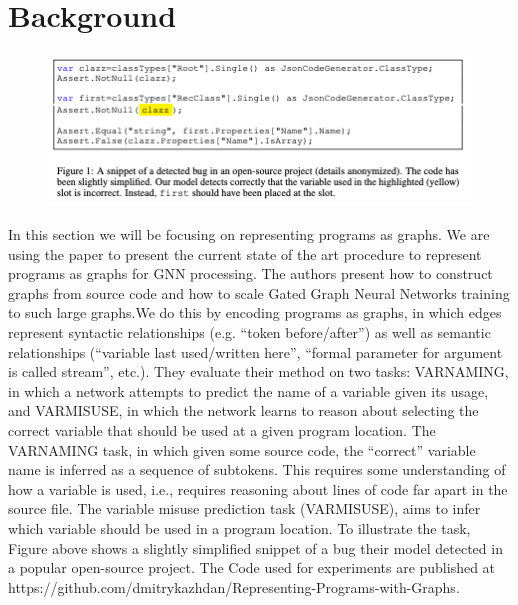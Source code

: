 \documentclass{article}
\begin{document}
\section{Background}

\begin{figure}[ht]
\vskip 0.2in
\begin{center}
\centerline{\includegraphics[width=\columnwidth]{Images/Background1.png}}
\label{icml-historical}
\end{center}
\vskip -0.2in
\end{figure}
In this section we will be focusing on representing programs as graphs. We are using the paper \cite{allamanis2017learning} to present the current state of the art procedure to represent programs as graphs for GNN processing. The authors present how to construct graphs from source code and how to scale Gated Graph Neural Networks training to such large graphs.We do this by encoding programs as graphs, in which edges represent syntactic relationships (e.g. “token before/after”) as well as semantic relationships (“variable last used/written here”, “formal parameter for argument is called stream”, etc.). They evaluate their method on two tasks: VARNAMING, in which a network attempts to predict the name of a variable given its usage, and VARMISUSE, in which the network learns to reason about selecting the correct variable that should be used at a given program location. The VARNAMING task, in which given some source code, the “correct” variable name is inferred as a sequence of subtokens. This requires some understanding of how a variable is used, i.e., requires reasoning about lines of code far apart in the source file. The variable misuse prediction task (VARMISUSE), aims to infer which variable should be used in a program location. To illustrate the task, Figure above shows a slightly simplified snippet of a bug their model detected in a popular open-source project. The Code used for experiments are published at https://github.com/dmitrykazhdan/Representing-Programs-with-Graphs.
\end{document}
